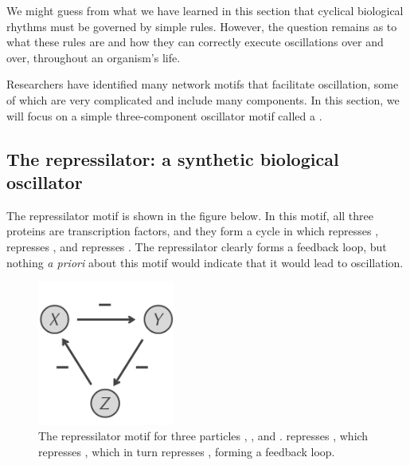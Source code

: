 We might guess from what we have learned in this section that cyclical biological rhythms must be governed by simple rules. However, the question remains as to what these rules are and how they can correctly execute oscillations over and over, throughout an organism's life.

Researchers have identified many network motifs that facilitate oscillation, some of which are very complicated and include many components. In this section, we will focus on a simple three-component oscillator motif called a .

\FloatBarrier
{}
\subsection{The repressilator: a synthetic biological oscillator}

The repressilator motif is shown in the figure below. In this motif, all three proteins are transcription factors, and they form a cycle in which  represses ,  represses , and  represses . The repressilator clearly forms a feedback loop, but nothing \textit{a priori} about this motif would indicate that it would lead to oscillation.\\

\begin{figure}[h]
\centering
\mySfFamily
\includegraphics[width = 0.4\textwidth]{../images/repressilator.png}
\caption{The repressilator motif for three particles , , and .  represses , which represses , which in turn represses , forming a feedback loop.}
\label{fig:repressilator}
\end{figure}

\begin{qbox}\end{qbox} 

